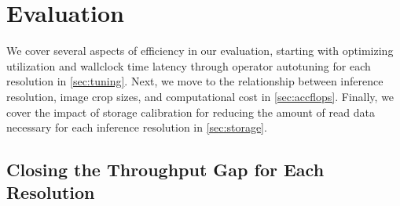 \section{Evaluation}
We cover several aspects of efficiency in our evaluation, starting with optimizing utilization and wallclock time latency through operator autotuning for each resolution in \autoref{sec:tuning}.
Next, we move to the relationship between inference resolution, image crop sizes, and computational cost in \autoref{sec:accflops}.
Finally, we cover the impact of storage calibration for reducing the amount of read data necessary for each inference resolution in \autoref{sec:storage}.

\subsection{Closing the Throughput Gap for Each Resolution}
\label{sec:tuning}
